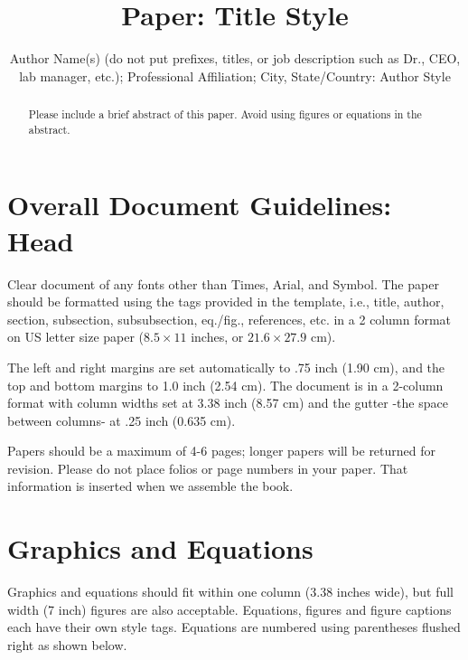 \documentclass[letterpaper,twocolumn,fleqn]{article}
\title{Paper: Title Style}
\author{ Author Name(s) (do not put prefixes, titles, or job description such as Dr., CEO, lab manager, etc.); Professional Affiliation; City, State/Country: Author Style}
\date{} %
\begin{document}
 

\maketitle 

\thispagestyle{empty} %


\begin{abstract}
Please include a brief abstract of this paper. Avoid using figures or
equations in the abstract.
\end{abstract}


\section{Overall Document Guidelines: Head}
\label{sec:intro}

Clear document of any fonts other than Times, Arial, and Symbol. The
paper should be formatted using the tags provided in the template,
i.e., title, author, section, subsection, subsubsection, eq./fig.,
references, etc.  in a 2 column format on US letter size paper ($8.5
\times 11$ inches, or $21.6 \times 27.9$ cm).

The left and right margins are set automatically to .75 inch (1.90 cm),
and the top and bottom margins to 1.0 inch (2.54 cm). The document is in
a 2-column format with column widths set at 3.38 inch (8.57 cm) and the
gutter -the space between columns- at .25 inch (0.635 cm).

Papers should be a maximum of 4-6 pages; longer papers will be
returned for revision. Please do not place folios or page numbers in
your paper. That information is inserted when we assemble the book.


\section{Graphics and Equations}
Graphics and equations should fit within one column (3.38 inches
wide), but full width (7 inch) figures are also acceptable. Equations,
figures and figure captions each have their own style tags. Equations
are numbered using parentheses flushed right as shown below.
\end{document}

